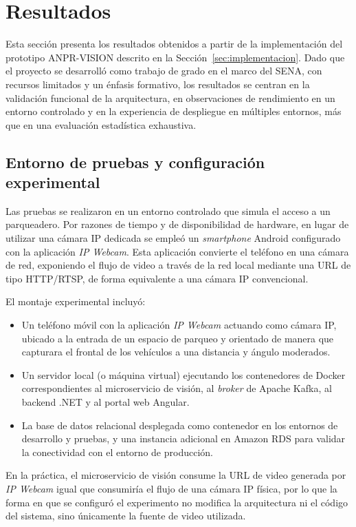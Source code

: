 \section{Resultados}
\label{sec:resultados}

Esta sección presenta los resultados obtenidos a partir de la implementación del prototipo ANPR-VISION descrito en la Sección~\ref{sec:implementacion}. Dado que el proyecto se desarrolló como trabajo de grado en el marco del SENA, con recursos limitados y un énfasis formativo, los resultados se centran en la validación funcional de la arquitectura, en observaciones de rendimiento en un entorno controlado y en la experiencia de despliegue en múltiples entornos, más que en una evaluación estadística exhaustiva.

\subsection{Entorno de pruebas y configuración experimental}

Las pruebas se realizaron en un entorno controlado que simula el acceso a un parqueadero. Por razones de tiempo y de disponibilidad de hardware, en lugar de utilizar una cámara IP dedicada se empleó un \textit{smartphone} Android configurado con la aplicación \textit{IP Webcam}. Esta aplicación convierte el teléfono en una cámara de red, exponiendo el flujo de video a través de la red local mediante una URL de tipo HTTP/RTSP, de forma equivalente a una cámara IP convencional.

El montaje experimental incluyó:

\begin{itemize}
    \item Un teléfono móvil con la aplicación \textit{IP Webcam} actuando como cámara IP, ubicado a la entrada de un espacio de parqueo y orientado de manera que capturara el frontal de los vehículos a una distancia y ángulo moderados.
    \item Un servidor local (o máquina virtual) ejecutando los contenedores de Docker correspondientes al microservicio de visión, al \textit{broker} de Apache Kafka, al backend .NET y al portal web Angular.
    \item La base de datos relacional desplegada como contenedor en los entornos de desarrollo y pruebas, y una instancia adicional en Amazon RDS para validar la conectividad con el entorno de producción.
\end{itemize}

En la práctica, el microservicio de visión consume la URL de video generada por \textit{IP Webcam} igual que consumiría el flujo de una cámara IP física, por lo que la forma en que se configuró el experimento no modifica la arquitectura ni el código del sistema, sino únicamente la fuente de video utilizada.

